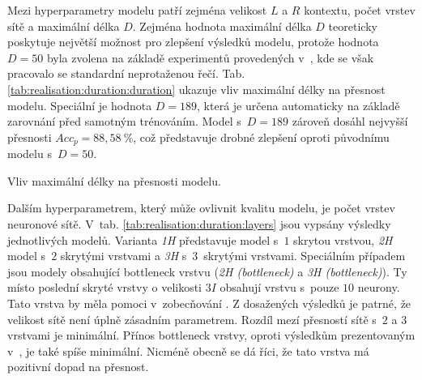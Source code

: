 Mezi hyperparametry modelu patří zejména velikost $L$ a $R$ kontextu, počet vrstev sítě a maximální délka $D$. Zejména hodnota maximální délka $D$ teoreticky poskytuje největší možnost pro zlepšení výsledků modelu, protože hodnota $D=50$ byla zvolena na základě experimentů provedených v~\cite{Hadian2017}, kde se však pracovalo se standardní neprotaženou řečí. Tab. \ref{tab:realisation:duration:duration} ukazuje vliv maximální délky na přesnost modelu. Speciální je hodnota $D=189$, která je určena automaticky na základě zarovnání před samotným trénováním. Model s~$D=189$ zároveň dosáhl nejvyšší přesnosti $Acc_{p} = 88,58~\%$, což představuje drobné zlepšení oproti původnímu modelu s~$D = 50$.

\begin{table}[htpb]
  \centering
  \def\arraystretch{1.5}
  \caption{Vliv maximální délky na přesnosti modelu.}
  \label{tab:realisation:duration:duration}
\end{table}

Dalším hyperparametrem, který může ovlivnit kvalitu modelu, je počet vrstev neuronové sítě. V~tab. \ref{tab:realisation:duration:layers} jsou vypsány výsledky jednotlivých modelů. Varianta \textit{1H} představuje model s~$1$ skrytou vrstvou, \textit{2H} model s~$2$ skrytými vrstvami a \textit{3H} s~$3$~skrytými vrstvami. Speciálním případem jsou modely obsahující bottleneck vrstvu (\textit{2H (bottleneck)} a \textit{3H (bottleneck)}). Ty místo poslední skryté vrstvy o velikosti $3I$ obsahují vrstvu s~pouze $10$ neurony. Tato vrstva by měla pomoci v~zobecňování \cite{Hadian2017}. Z dosažených výsledků je patrné, že velikost sítě není úplně zásadním parametrem. Rozdíl mezí přesností sítě s~$2$ a $3$ vrstvami je minimální. Přínos bottleneck vrstvy, oproti výsledkům prezentovaným v~\cite{Hadian2017}, je také spíše minimální. Nicméně obecně se dá říci, že tato vrstva má pozitivní dopad na přesnost.

